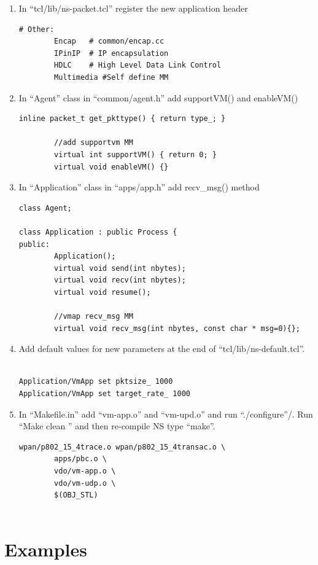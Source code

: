 \documentclass[11pt]{article} %
\begin{document}
\begin{enumerate}
	\item In “tcl/lib/ns-packet.tcl” register the new application header
\begin{lstlisting}[title="ns-packet.tcl"]
# Other:
        Encap   # common/encap.cc
        IPinIP  # IP encapsulation 
        HDLC    # High Level Data Link Control
        Multimedia #Self define MM
\end{lstlisting}

	\item In “Agent” class in “common/agent.h” add supportVM() and enableVM()
\begin{lstlisting}[title="agent.h"]
        inline packet_t get_pkttype() { return type_; }

        //add supportvm MM
        virtual int supportVM() { return 0; }
        virtual void enableVM() {}

\end{lstlisting}

	\item In “Application” class in “apps/app.h” add recv\_msg() method
\begin{lstlisting}[title="app.h"]
class Agent;

class Application : public Process {
public:
        Application();
        virtual void send(int nbytes);
        virtual void recv(int nbytes);
        virtual void resume();

        //vmap recv_msg MM
        virtual void recv_msg(int nbytes, const char * msg=0){};
\end{lstlisting}

	\item Add default values for new parameters at the end of “tcl/lib/ns-default.tcl”. 

\begin{lstlisting}[title="ns-default.tcl"]

Application/VmApp set pktsize_ 1000
Application/VmApp set target_rate_ 1000

\end{lstlisting}

	\item In “Makefile.in” add “vm-app.o” and “vm-upd.o” and run “./configure”/. Run “Make clean ” and then re-compile NS type “make”.
\begin{lstlisting}[title="Makefile"]
        wpan/p802_15_4trace.o wpan/p802_15_4transac.o \
        apps/pbc.o \
        vdo/vm-app.o \
        vdo/vm-udp.o \
        $(OBJ_STL)


\end{lstlisting}

\end{enumerate}
\section{Examples}
\end{document}
